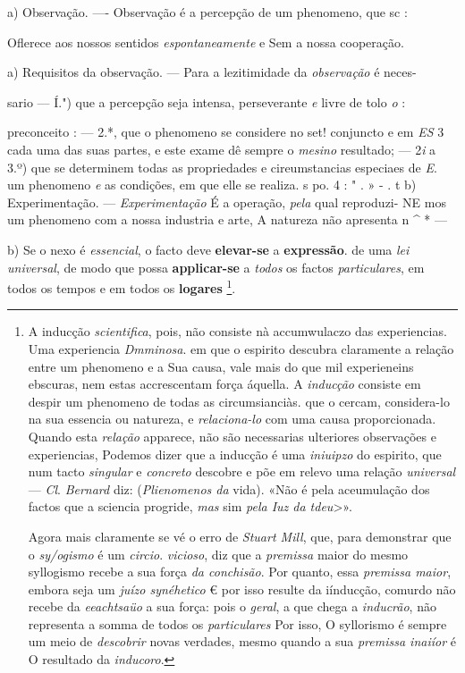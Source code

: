 a) Observação. ---- Observação é a percepção de um phenomeno, que sc :

Oflerece aos nossos sentidos \emph{espontaneamente} e Sem a nossa cooperação.

a) Requisitos da observação. --- Para a lezitimidade da \emph{observação} é neces-

sario --- Í.") que a percepção seja intensa, perseverante \emph{e} livre de tolo \emph{o} :

preconceito : --- 2.*, que o phenomeno se considere no set! conjuncto e em \emph{ES} 3 cada uma das suas partes, e este exame dê sempre o \emph{mesino} resultado; --- 2\emph{i} a 3.º) que se determinem todas as propriedades e cireumstancias especiaes de \emph{E}. um phenomeno \emph{e} as condições, em que elle se realiza. s po. 4 : " . » - . t b) Experimentação. --- \emph{Experimentação} É a operação, \emph{pela} qual reproduzi- NE mos um phenomeno com a nossa industria e arte, A natureza não apresenta n \textasciicircum{} * ---

b) Se o nexo é \emph{essencial}, o facto deve \textbf{elevar-se} a \textbf{expressão}. de uma \emph{lei universal}, de modo que possa \textbf{applicar-se} a \emph{todos} os factos \emph{particulares}, em todos os tempos e em todos os \textbf{logares} \footnote{A inducção \emph{scientifica}, pois, não consiste nà accumwulaczo das experiencias. Uma experiencia \emph{Dmminosa}. em que o espirito descubra claramente a relação entre um phenomeno e a Sua causa, vale mais do que mil experieneins ebscuras, nem estas accrescentam força áquella. A \emph{inducção} consiste em despir um phenomeno de todas as circumsianciàs. que o cercam, considera-lo na sua essencia ou natureza, e \emph{relaciona-lo} com uma causa proporcionada. Quando esta \emph{relação} apparece, não são necessarias ulteriores observações e experiencias, Podemos dizer que a inducção é uma \emph{iniuipzo} do espirito, que num tacto \emph{singular} e \emph{concreto} descobre e põe em relevo uma relação \emph{universal} --- \emph{Cl}. \emph{Bernard} diz: (\emph{Plienomenos da} vida). «Não é pela aceumulação dos factos que a sciencia progride, \emph{mas} sim \emph{pela Iuz da tdeu}\textgreater{}».\par Agora mais claramente se vé o erro de \emph{Stuart Mill}, que, para demonstrar que o \emph{sy/ogismo} é um \emph{circio}. \emph{vicioso}, diz que a \emph{premissa} maior do mesmo syllogismo recebe a sua força \emph{da conchisão}. Por quanto, essa \emph{premissa maior}, embora seja um \emph{juízo synéhetico} € por isso resulte da iínducção, comurdo não recebe da \emph{eeachtsaüo} a sua força: pois o \emph{geral}, a que chega a \emph{inducrão}, não representa a somma de todos os \emph{particulares} Por isso, O syllorismo é sempre um meio de \emph{descobrir} novas verdades, mesmo quando a sua \emph{premissa inaiíor} é O resultado da \emph{inducoro}.\par *}.

